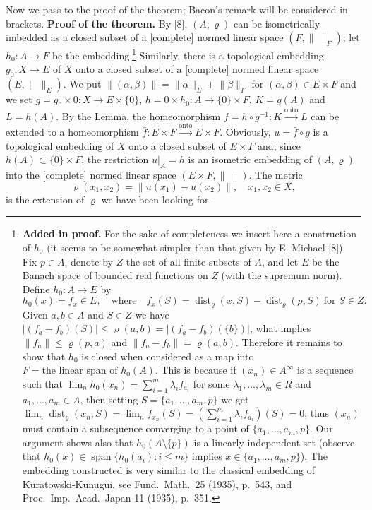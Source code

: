 \documentclass[11pt,a4paper,twoside]{article}
\newcommand{\onto}{\xrightarrow{\mathrm{onto}}}
\newcommand{\norm}[1]{\lVert#1\rVert}
\begin{document}
Now we pass to the proof of the theorem; Bacon's remark will be considered in brackets.
\newpage
\textbf{Proof of the theorem.} By [8], $(A,\varrho)$ can be isometrically imbedded as a closed subset of a [complete] normed linear space $(F,\norm{\ }_F)$; let $h_0\colon A\to F$ be the embedding.\footnote{\textbf{Added in proof.} For the sake of completeness we insert here a construction of $h_0$ (it seems to be somewhat simpler than that given by E. Michael [8]). Fix $p\in A$, denote by $Z$ the set of all finite subsets of $A$, and let $E$ be the Banach space of bounded real functions on $Z$ (with the supremum norm). Define $h_0\colon A\to E$ by
\[
h_0(x)=f_x\in E,\quad\text{where}\quad f_x(S)=\operatorname{dist}_{\varrho}(x,S)-\operatorname{dist}_{\varrho}(p,S)\ \text{for }S\in Z.
\]
Given $a,b\in A$ and $S\in Z$ we have $|(f_a-f_b)(S)|\leq\varrho(a,b)=|(f_a-f_b)(\{b\})|$, what implies $\norm{f_a}\leq\varrho(p,a)$ and $\norm{f_a-f_b}=\varrho(a,b)$. Therefore it remains to show that $h_0$ is closed when considered as a map into $F=\text{the linear span of }h_0(A)$. This is because if $(x_n)\in A^{\infty}$ is a sequence such that $\lim_n h_0(x_n)=\sum_{i=1}^m\lambda_i f_{a_i}$ for some $\lambda_1,\ldots,\lambda_m\in R$ and $a_1,\ldots,a_m\in A$, then setting $S=\{a_1,\ldots,a_m,p\}$ we get $\lim_n\operatorname{dist}_{\varrho}(x_n,S)=\lim_n f_{x_n}(S)=(\sum_{i=1}^m\lambda_i f_{a_i})(S)=0$; thus $(x_n)$ must contain a subsequence converging to a point of $\{a_1,\ldots,a_m,p\}$. Our argument shows also that $h_0(A\setminus\{p\})$ is a linearly independent set (observe that $h_0(x)\in\operatorname{span}\{h_0(a_i):i\leq m\}$ implies $x\in\{a_1,\ldots,a_m,p\}$). The embedding constructed is very similar to the classical embedding of Kuratowski-Kunugui, see Fund.\ Math.\ 25 (1935), p.\ 543, and Proc.\ Imp.\ Acad.\ Japan 11 (1935), p.\ 351.}
Similarly, there is a topological embedding $g_0\colon X\to E$ of $X$ onto a closed subset of a [complete] normed linear space $(E,\norm{\ }_E)$. We put $\norm{(\alpha,\beta)}=\norm{\alpha}_E+\norm{\beta}_F$ for $(\alpha,\beta)\in E\times F$ and we set $g=g_0\times0\colon X\to E\times\{0\}$, $h=0\times h_0\colon A\to\{0\}\times F$, $K=g(A)$ and $L=h(A)$. By the Lemma, the homeomorphism $f=h\circ g^{-1}\colon K\onto L$ can be extended to a homeomorphism $\bar f\colon E\times F\onto E\times F$. Obviously, $u=\bar f\circ g$ is a topological embedding of $X$ onto a closed subset of $E\times F$ and, since $h(A)\subset\{0\}\times F$, the restriction $u|_A=h$ is an isometric embedding of $(A,\varrho)$ into the [complete] normed linear space $(E\times F,\norm{\ })$. The metric
\[
\bar\varrho(x_1,x_2)=\norm{u(x_1)-u(x_2)},\quad x_1,x_2\in X,
\]
is the extension of $\varrho$ we have been looking for.
\end{document}
